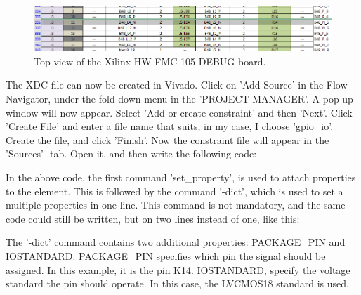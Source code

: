 \begin{figure}[H]
    \centering
    \includegraphics[width=1\textwidth]{Graphics/pinout-planner.PNG}
    \caption{Top view of the Xilinx HW-FMC-105-DEBUG board.}
    \label{fig:pinout-planner}
\end{figure}

\noindent The XDC file can now be created in Vivado. Click on 'Add Source' in the Flow Navigator, under the fold-down menu in the 'PROJECT MANAGER'. A pop-up window will now appear. Select 'Add or create constraint' and then 'Next'. Click 'Create File' and enter a file name that suits; in my case, I choose 'gpio\_io'. Create the file, and click 'Finish'. Now the constraint file will appear in the 'Sources'- tab. Open it, and then write the following code: 

\vspace{-0.9 cm}
\noindent In the above code, the first command 'set\_property', is used to attach properties to the element. This is followed by the command '-dict', which is used to set a multiple properties in one line. This command is not mandatory, and the same code could still be written, but on two lines instead of one, like this:  
\vspace{-0.9 cm}
 \noindent The '-dict' command contains two additional properties: PACKAGE\_PIN and IOSTANDARD. PACKAGE\_PIN specifies which pin the signal should be assigned. In this example, it is the pin K14. IOSTANDARD, specify the voltage standard the pin should operate. In this case, the LVCMOS18 standard is used.
 
